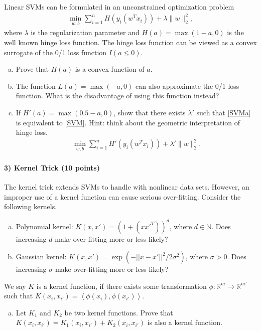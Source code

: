 \documentclass[11pt]{article}
\begin{document}
Linear SVMs can be formulated in an unconstrained optimization problem
\begin{align}\label{SVM}
\min_{w,b}\sum_{i=1}^n H(y_i(w^Tx_i)) + \lambda\|w\|_2^2,
\end{align}
where $\lambda$ is the regularization parameter and $H(a) = \max(1-a,0)$ is the well known hinge loss function. The hinge loss function can be viewed as a convex surrogate of the 0/1 loss function $I(a \leq 0)$.
\begin{enumerate}[(a)]
\item Prove that $H(a)$ is a convex function of $a$.
\item The function $L(a) = \max(-a,0)$ can also approximate the 0/1 loss function. What is the disadvantage of using this function instead?
\item If $H'(a) = \max(0.5-a,0)$, show that there exists $\lambda'$ such that \eqref{SVMa} is equivalent to \eqref{SVM}.  Hint: think about the geometric interpretation of hinge loss.
\begin{align}\label{SVMa}
\min_{w,b}\sum_{i=1}^n H'(y_i(w^Tx_i)) + \lambda'\|w\|_2^2.
\end{align}
\end{enumerate}

\paragraph{3) Kernel Trick (10 points)}
The kernel trick extends SVMs to handle with nonlinear data sets. However, an improper use of a kernel function can cause serious over-fitting. Consider the following kernels.
\begin{enumerate}[(a)]
\item Polynomial kernel: $K(x, x') = (1 + (x x'^T))^d$, where  $d\in\mathbb{N}$. Does increasing $d$ make over-fitting more or less likely?
\item Gaussian kernel: $K(x, x') = \exp(-|| x-x'||^2 / 2 \sigma^2)$, where $\sigma>0$. Does increasing $\sigma$ make over-fitting more or less likely?
\end{enumerate}
We say $K$ is a kernel function, if there exists some transformation $\phi:\mathbb{R}^m\rightarrow \mathbb{R}^{m'}$ such that $K(x_i,x_{i'}) = \left<\phi(x_i),\phi(x_{i'})\right>$.
\begin{enumerate}[(c)]
\item Let $K_1$ and $K_2$ be two kernel functions. Prove that $K(x_i,x_{i'}) = K_1(x_i,x_{i'}) + K_2(x_i,x_{i'})$ is also a kernel function.
\end{enumerate}
\end{document}
